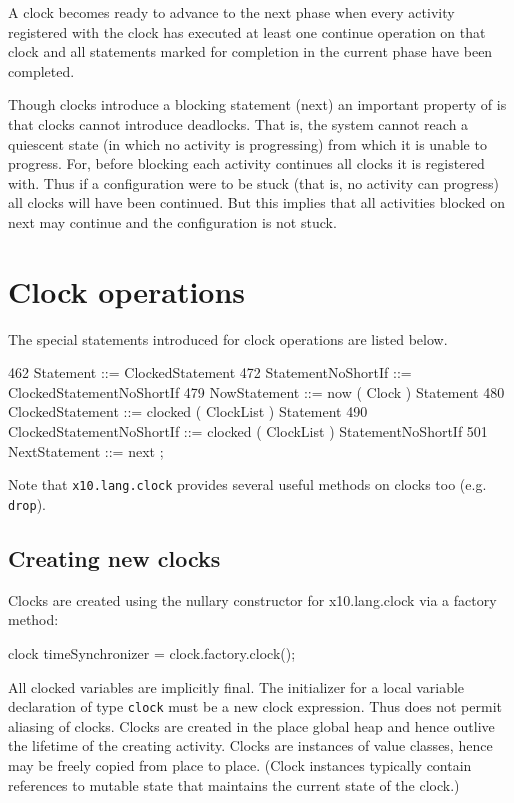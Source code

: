 A clock becomes ready to advance to the next phase when every activity
registered with the clock has executed at least one {\cf continue}
operation on that clock and all statements marked for completion in
the current phase have been completed.

Though clocks introduce a blocking statement ({\cf next}) an important
property of \Xten{} is that clocks cannot introduce deadlocks. That is,
the system cannot reach a quiescent state (in which no activity is
progressing) from which it is unable to progress. For, before blocking
each activity continues all clocks it is registered with. Thus if a
configuration were to be stuck (that is, no activity can progress) all
clocks will have been continued. But this implies that all activities
blocked on {\cf next} may continue and the configuration is not stuck.

\section{Clock operations}
The special statements introduced for clock operations are listed below.
\begin{x10}
462 Statement ::= ClockedStatement
472 StatementNoShortIf ::= ClockedStatementNoShortIf
479 NowStatement ::= now ( Clock ) Statement
480 ClockedStatement ::= 
      clocked ( ClockList ) Statement
490 ClockedStatementNoShortIf ::= 
      clocked ( ClockList ) StatementNoShortIf
501 NextStatement ::= next ;
\end{x10}

Note that {\tt x10.lang.clock} provides several useful methods on
clocks too (e.g. {\tt drop}).

\subsection{Creating new clocks}
Clocks are created using the nullary constructor for {\cf
x10.lang.clock} via a factory method:

\begin{x10}
clock timeSynchronizer = clock.factory.clock();
\end{x10}

All clocked variables are implicitly final. The initializer for a
local variable declaration of type {\tt clock} must be a new clock
expression. Thus \Xten{} does not permit aliasing of clocks.
Clocks are created in the place global heap and hence outlive the
lifetime of the creating activity.  Clocks are instances of value
classes, hence may be freely copied from place to
place. (Clock instances typically contain references to mutable state
that maintains the current state of the clock.)

